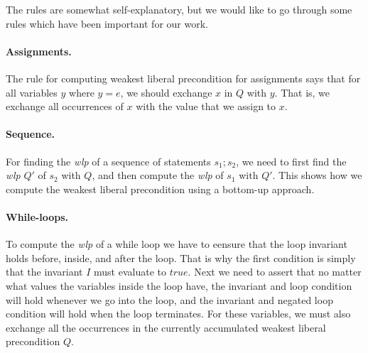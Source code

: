 The rules are somewhat self-explanatory, but we would like to go through some rules which have been important for our work.

\paragraph{Assignments.}
The rule for computing weakest liberal precondition for assignments says that for all variables $y$ where $y = e$, we should exchange $x$ in $Q$ with $y$. That is, we exchange all occurrences of $x$ with the value that we assign to $x$.

\paragraph{Sequence.}
For finding the \textit{wlp} of a sequence of statements $s_1;s_2$, we need to first find the \textit{wlp} $Q'$ of $s_2$ with $Q$, and then compute the \textit{wlp} of $s_1$ with $Q'$. This shows how we compute the weakest liberal precondition using a bottom-up approach.

\paragraph{While-loops.}
To compute the \textit{wlp} of a while loop we have to eensure that the loop invariant holds before, inside, and after the loop. That is why the first condition is simply that the invariant $I$ must evaluate to $true$.
Next we need to assert that no matter what values the variables inside the loop have, the invariant and loop condition will hold whenever we go into the loop, and the invariant and negated loop condition will hold when the loop terminates.
For these variables, we must also exchange all the occurrences in the currently accumulated weakest liberal precondition $Q$.

